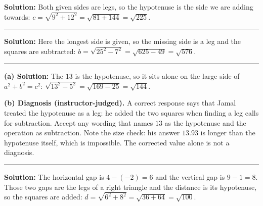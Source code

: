 \documentclass[12pt]{article}
\begin{document}



\textbf{Solution:} \quad Both given sides are legs, so the hypotenuse is the side we are adding
towards: $c = \sqrt{9^2 + 12^2} = \sqrt{81 + 144} = \sqrt{225}$.

\vspace{0.2cm}

\noindent\rule{\linewidth}{0.2pt}


\textbf{Solution:} \quad Here the longest side is given, so the missing side is a leg and the
squares are subtracted: $b = \sqrt{25^2 - 7^2} = \sqrt{625 - 49} = \sqrt{576}$.

\vspace{0.2cm}

\noindent\rule{\linewidth}{0.2pt}


\textbf{(a) Solution:} \quad The $13$ is the hypotenuse, so it sits alone on the large side of
$a^2 + b^2 = c^2$: $\sqrt{13^2 - 5^2} = \sqrt{169 - 25} = \sqrt{144}$.

\textbf{(b) Diagnosis (instructor-judged).} A correct response says that Jamal treated the
hypotenuse as a leg: he added the two squares when finding a leg calls for subtraction. Accept
any wording that names $13$ as the hypotenuse and the operation as subtraction. Note the size
check: his answer $13.93$ is longer than the hypotenuse itself, which is impossible. The
corrected value alone is not a diagnosis.

\vspace{0.2cm}

\noindent\rule{\linewidth}{0.2pt}


\textbf{Solution:} \quad The horizontal gap is $4 - (-2) = 6$ and the vertical gap is
$9 - 1 = 8$. Those two gaps are the legs of a right triangle and the distance is its hypotenuse,
so the squares are added: $d = \sqrt{6^2 + 8^2} = \sqrt{36 + 64} = \sqrt{100}$. 
\end{document}
